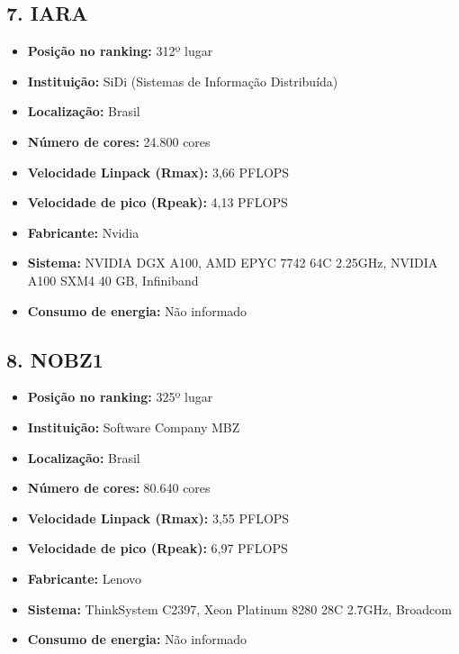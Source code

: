 \documentclass[12pt,a4paper]{article}
\begin{document}
\subsection*{7. IARA}
\begin{itemize}
    \item \textbf{Posição no ranking:} 312º lugar
    \item \textbf{Instituição:} SiDi (Sistemas de Informação Distribuída)
    \item \textbf{Localização:} Brasil
    \item \textbf{Número de cores:} 24.800 cores
    \item \textbf{Velocidade Linpack (Rmax):} 3,66 PFLOPS
    \item \textbf{Velocidade de pico (Rpeak):} 4,13 PFLOPS
    \item \textbf{Fabricante:} Nvidia
    \item \textbf{Sistema:} NVIDIA DGX A100, AMD EPYC 7742 64C 2.25GHz, NVIDIA A100 SXM4 40 GB, Infiniband
    \item \textbf{Consumo de energia:} Não informado
\end{itemize}

\newpage
\subsection*{8. NOBZ1}
\begin{itemize}
    \item \textbf{Posição no ranking:} 325º lugar
    \item \textbf{Instituição:} Software Company MBZ
    \item \textbf{Localização:} Brasil
    \item \textbf{Número de cores:} 80.640 cores
    \item \textbf{Velocidade Linpack (Rmax):} 3,55 PFLOPS
    \item \textbf{Velocidade de pico (Rpeak):} 6,97 PFLOPS
    \item \textbf{Fabricante:} Lenovo
    \item \textbf{Sistema:} ThinkSystem C2397, Xeon Platinum 8280 28C 2.7GHz, Broadcom
    \item \textbf{Consumo de energia:} Não informado
\end{itemize}
\end{document}

